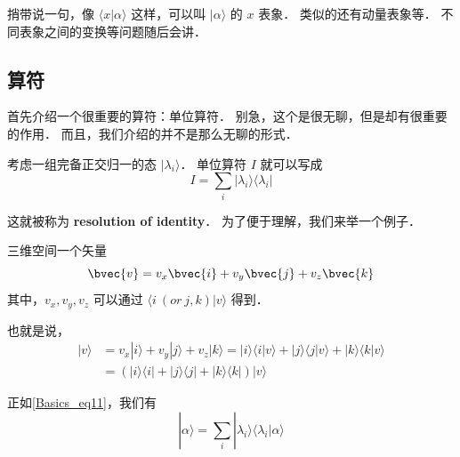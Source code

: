 捎带说一句，像 $\langle x|\alpha\rangle$ 这样，可以叫 $|\alpha \rangle$ 的 $x$ 表象． 类似的还有动量表象等． 不同表象之间的变换等问题随后会讲．

\subsection{算符}

首先介绍一个很重要的算符：单位算符． 别急，这个是很无聊，但是却有很重要的作用． 而且，我们介绍的并不是那么无聊的形式．

考虑一组完备正交归一的态 $|\lambda_i\rangle$． 单位算符 $I$ 就可以写成
\begin{equation}\label{Basics_eq11}
I = \sum_i |\lambda_i\rangle\langle\lambda_i|
\end{equation}

这就被称为 \textbf{resolution of identity}． 为了便于理解，我们来举一个例子．

\begin{example}{}
三维空间一个矢量
\begin{equation}
\bvec{v} = v_x\bvec{i} + v_y\bvec{j} + v_z \bvec{k} 
\end{equation}
其中，$v_x, v_y, v_z$ 可以通过 $\langle i\ (or\ j, k)|v\rangle$ 得到．

也就是说，
\begin{equation}
\begin{split}
|v\rangle &= v_x|i\rangle + v_y|j\rangle + v_z|k\rangle = |i\rangle\langle i|v\rangle + |j\rangle\langle j|v\rangle + |k\rangle\langle k|v\rangle\\ &= (|i\rangle\langle i|+|j\rangle\langle j|+|k\rangle\langle k|)|v\rangle
\end{split}
\end{equation}
\end{example}{}
正如\autoref{Basics_eq11}，我们有
\begin{equation}
|\alpha\rangle = \sum_i |\lambda_i\rangle\langle\lambda_i|\alpha\rangle
\end{equation}


